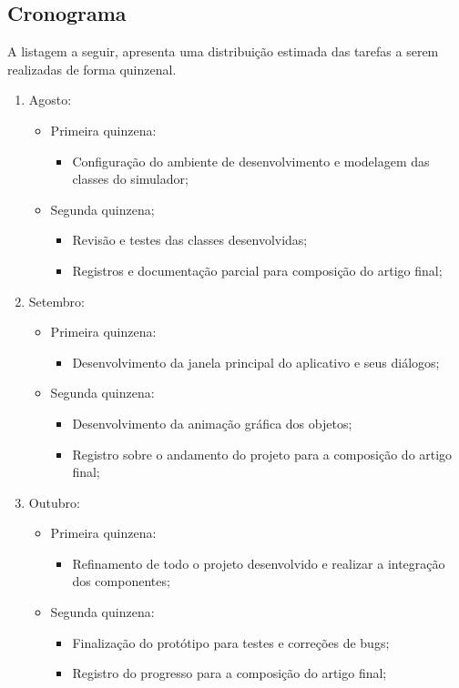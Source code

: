 \subsection{Cronograma}

A listagem a seguir, apresenta uma distribuição estimada das tarefas a serem
realizadas de forma quinzenal.

\begin{enumerate}
\item Agosto:
  \begin{itemize}
    \item Primeira quinzena:
    \begin{itemize}
      \item Configuração do ambiente de desenvolvimento e modelagem das classes do simulador;
    \end{itemize}
    \item Segunda quinzena;
      \begin{itemize}
        \item Revisão e testes das classes desenvolvidas;
        \item Registros e documentação parcial para composição do artigo final;
      \end{itemize}
    \end{itemize}

\item Setembro:
  \begin{itemize}
    \item Primeira quinzena:
      \begin{itemize}
        \item Desenvolvimento da janela principal do aplicativo e seus diálogos;
      \end{itemize}
    \item Segunda quinzena:
      \begin{itemize}
        \item Desenvolvimento da animação gráfica dos objetos;
        \item Registro sobre o andamento do projeto para a composição do artigo final;
      \end{itemize}
  \end{itemize}

\item Outubro:
  \begin{itemize}
    \item Primeira quinzena:
      \begin{itemize}
        \item Refinamento de todo o projeto desenvolvido e realizar a integração dos componentes;
      \end{itemize}
    \item Segunda quinzena:
      \begin{itemize}
        \item Finalização do protótipo para testes e correções de bugs;
        \item Registro do progresso para a composição do artigo final;
      \end{itemize}
  \end{itemize}


\end{enumerate}
